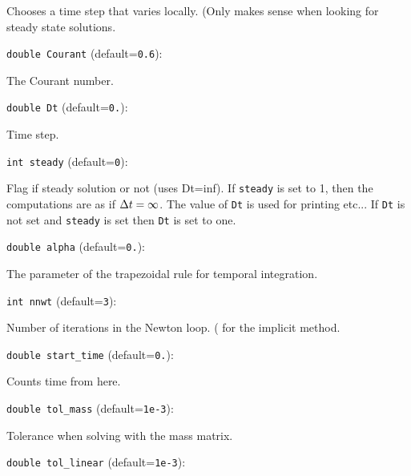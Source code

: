 Chooses a time step that varies locally. (Only makes sense
when looking for steady state solutions. 

\item\verb+double Courant+ {\rm(default=\verb|0.6|)}:

The Courant number.

\item\verb+double Dt+ {\rm(default=\verb|0.|)}:

Time step. 

\item\verb+int steady+ {\rm(default=\verb|0|)}:

Flag if steady solution or not (uses Dt=inf). If \verb+steady+
is set to 1, then the computations are as if ${\Delta t}=\infty$. 
The value of \verb+Dt+ is used for printing etc... If \verb+Dt+
is not set and \verb+steady+ is set then \verb+Dt+ is set to one.

\item\verb+double alpha+ {\rm(default=\verb|0.|)}:

The parameter of the trapezoidal rule
for temporal integration. 

\item\verb+int nnwt+ {\rm(default=\verb|3|)}:

Number of iterations in the Newton loop. (
for the implicit method. 

\item\verb+double start_time+ {\rm(default=\verb|0.|)}:

Counts time from here.

\item\verb+double tol_mass+ {\rm(default=\verb|1e-3|)}:

Tolerance when solving with the mass matrix. 

\item\verb+double tol_linear+ {\rm(default=\verb|1e-3|)}:

